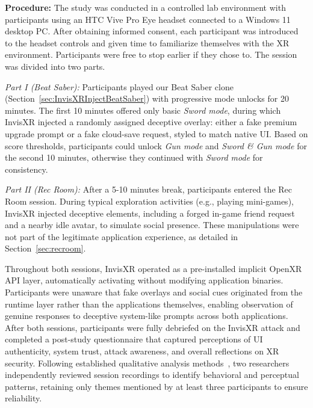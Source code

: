 \documentclass[letterpaper,twocolumn,10pt]{article}
\begin{document}
\textbf{Procedure:}
The study was conducted in a controlled lab environment with participants using an HTC Vive Pro Eye headset connected to a Windows 11 desktop PC. After obtaining informed consent, each participant was introduced to the headset controls and given time to familiarize themselves with the XR environment. Participants were free to stop earlier if they chose to. The session was divided into two parts. 


\textit{Part I (Beat Saber):} Participants played our Beat Saber clone (Section~\ref{sec:InvisXRInjectBeatSaber}) with progressive mode unlocks for 20 minutes. The first 10 minutes offered only basic \textit{Sword mode}, during which InvisXR injected a randomly assigned deceptive overlay: either a fake premium upgrade prompt or a fake cloud-save request, styled to match native UI. Based on score thresholds, participants could unlock \textit{Gun mode} and \textit{Sword \& Gun mode} for the second 10 minutes, otherwise they continued with \textit{Sword mode} for consistency.


\textit{Part II (Rec Room):} After a 5-10 minutes break, participants entered the Rec Room session. During typical exploration activities (e.g., playing mini-games), InvisXR injected deceptive elements, including a forged in-game friend request and a nearby idle avatar, to simulate social presence. These manipulations were not part of the legitimate application experience, as detailed in Section~\ref{sec:recroom}. 

Throughout both sessions, InvisXR operated as a pre-installed implicit OpenXR API layer, automatically activating without modifying application binaries. Participants were unaware that fake overlays and social cues originated from the runtime layer rather than the applications themselves, enabling observation of genuine responses to deceptive system-like prompts across both applications. After both sessions, participants were fully debriefed on the InvisXR attack and completed a post-study questionnaire that captured perceptions of UI authenticity, system trust, attack awareness, and overall reflections on XR security. Following established qualitative analysis methods~\cite{saldana2021coding}, two researchers independently reviewed session recordings to identify behavioral and perceptual patterns, retaining only themes mentioned by at least three participants to ensure reliability.
\end{document}
